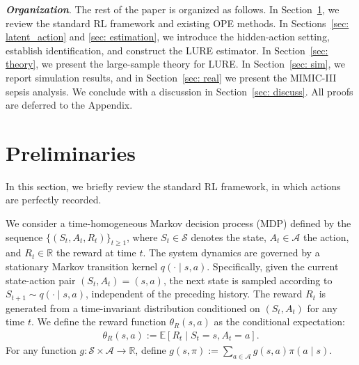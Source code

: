 \documentclass[12pt]{article}
\newcommand{\0}{\boldsymbol{0}}
\begin{document}



\textbf{\textit{Organization}}. The rest of the paper is organized as follows. In Section~\ref{sec: prelim}, we review the standard RL framework and existing OPE methods. In Sections~\ref{sec: latent_action} and \ref{sec: estimation}, we introduce the hidden-action setting, establish identification, and construct the LURE estimator. In Section~\ref{sec: theory}, we present the large-sample theory for LURE. In Section~\ref{sec: sim}, we report simulation results, and in Section~\ref{sec: real} we present the MIMIC-III sepsis analysis. We conclude with a discussion in Section~\ref{sec: discuss}. All proofs are deferred to the Appendix.






\section{Preliminaries} \label{sec: prelim}

In this section, we briefly review the standard RL framework, in which actions are perfectly recorded. 

We consider a time-homogeneous Markov decision process (MDP) defined by the sequence $\{(S_t, A_t, R_t)\}_{t \ge 1}$, where $S_t \in \mathcal{S}$ denotes the state, $A_t \in \mathcal{A}$ the action, and $R_t \in \mathbb{R}$ the reward at time $t$. The system dynamics are governed by a stationary Markov transition kernel $q(\cdot \mid s, a)$. Specifically, given the current state-action pair $(S_t, A_t) = (s, a)$, the next state is sampled according to $S_{t+1} \sim q(\cdot \mid s, a)$, independent of the preceding history. The reward $R_t$ is generated from a time-invariant distribution conditioned on $(S_t, A_t)$ for any time $t$. We define the reward function $\theta_R(s, a)$ as the conditional expectation: \begin{gather*}
    \theta_R(s, a) := \mathbb{E}[R_t \mid S_t = s, A_t = a].
\end{gather*} 
For any function $g:\mathcal{S}\times\mathcal{A}\to\mathbb{R}$, define $g(s,\pi):=\sum_{a\in\mathcal{A}} g(s,a)\pi(a\mid s)$.
\end{document}
